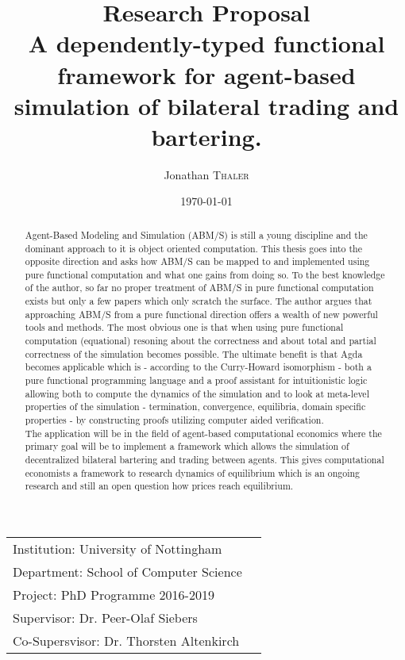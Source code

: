 \documentclass{article}
\title{ {\normalsize Research Proposal} \\ A dependently-typed functional framework for agent-based simulation of bilateral trading and bartering.} %
\author{Jonathan \textsc{Thaler}} %
\date{\today} %
\begin{document}
\maketitle %

\begin{center}
\begin{tabular}{l r}
Institution: University of Nottingham \\
Department: School of Computer Science \\
Project: PhD Programme 2016-2019 \\
Supervisor: Dr. Peer-Olaf Siebers \\
Co-Supersvisor: Dr. Thorsten Altenkirch 
\end{tabular}
\end{center}

\begin{abstract}
Agent-Based Modeling and Simulation (ABM/S) is still a young discipline and the dominant approach to it is object oriented computation. This thesis goes into the opposite direction and asks how ABM/S can be mapped to and implemented using pure functional computation and what one gains from doing so. To the best knowledge of the author, so far no proper treatment of ABM/S in pure functional computation exists but only a few papers which only scratch the surface. The author argues that approaching ABM/S from a pure functional direction  offers a wealth of new powerful tools and methods. The most obvious one is that when using pure functional computation (equational) resoning about the correctness and about total and partial correctness of the simulation becomes possible. The ultimate benefit is that Agda becomes applicable which is - according to the Curry-Howard isomorphism - both a pure functional programming language and a proof assistant for intuitionistic logic allowing both to compute the dynamics of the simulation and to look at meta-level properties of the simulation - termination, convergence, equilibria, domain specific properties - by constructing proofs utilizing computer aided verification. \\
The application will be in the field of agent-based computational economics where the primary goal will be to implement a framework which allows the simulation of decentralized bilateral bartering and trading between agents. This gives computational economists a framework to research dynamics of equilibrium which is an ongoing research and still an open question how prices reach equilibrium.
\end{abstract}
\end{document}
